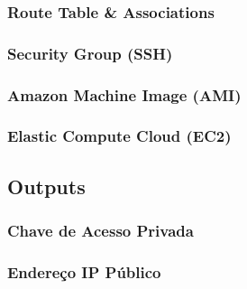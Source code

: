 \documentclass{article}
\begin{document}
\subsubsection{Route Table \& Associations}
\subsubsection{Security Group (SSH)}
\subsubsection{Amazon Machine Image (AMI)}
\subsubsection{Elastic Compute Cloud (EC2)}
\subsection{Outputs}
\subsubsection{Chave de Acesso Privada}
\subsubsection{Endereço IP Público}
\end{document}
